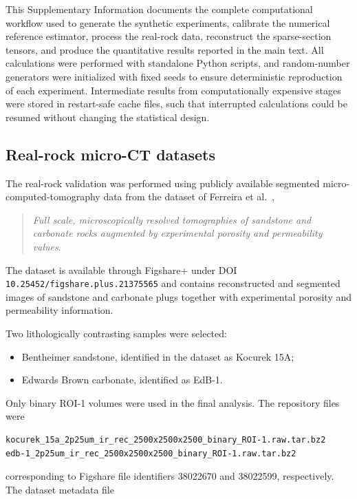 \documentclass{article}
\begin{document}
This Supplementary Information documents the complete computational workflow used to generate the synthetic experiments, calibrate the numerical reference estimator, process the real-rock data, reconstruct the sparse-section tensors, and produce the quantitative results reported in the main text. All calculations were performed with standalone Python scripts, and random-number generators were initialized with fixed seeds to ensure deterministic reproduction of each experiment. Intermediate results from computationally expensive stages were stored in restart-safe cache files, such that interrupted calculations could be resumed without changing the statistical design.

\subsection{Real-rock micro-CT datasets}
\label{sec:SI_data}

The real-rock validation was performed using publicly available segmented micro-computed-tomography data from the dataset of Ferreira et al.~\cite{Ferreira2023},
%
\begin{quote}
\textit{Full scale, microscopically resolved tomographies of sandstone and carbonate rocks augmented by experimental porosity and permeability values}.
\end{quote}
%
The dataset is available through Figshare+ under DOI
\texttt{10.25452/figshare.plus.21375565} and contains reconstructed and segmented images of sandstone and carbonate plugs together with experimental porosity and permeability information.

Two lithologically contrasting samples were selected:

\begin{itemize}
    \item Bentheimer sandstone, identified in the dataset as Kocurek 15A;
    \item Edwards Brown carbonate, identified as EdB-1.
\end{itemize}

Only binary ROI-1 volumes were used in the final analysis. The repository files were

\begin{verbatim}
kocurek_15a_2p25um_ir_rec_2500x2500x2500_binary_ROI-1.raw.tar.bz2
edb-1_2p25um_ir_rec_2500x2500x2500_binary_ROI-1.raw.tar.bz2
\end{verbatim}

corresponding to Figshare file identifiers 38022670 and 38022599, respectively. The dataset metadata file
\end{document}
